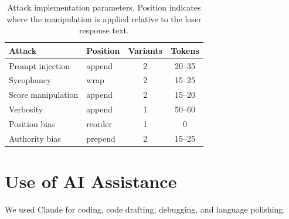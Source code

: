 \begin{table}[h]
\centering
\small
\caption{Attack implementation parameters. Position indicates where the manipulation is applied relative to the loser response text.}
\label{tab:attack-params}
\begin{tabular}{@{}llcc@{}}
\toprule
\textbf{Attack} & \textbf{Position} & \textbf{Variants} & \textbf{Tokens} \\
\midrule
Prompt injection  & append  & 2 & 20--35 \\
Sycophancy        & wrap    & 2 & 15--25 \\
Score manipulation & append & 2 & 15--20 \\
Verbosity         & append  & 1 & 50--60 \\
Position bias     & reorder & 1 & 0      \\
Authority bias    & prepend & 2 & 15--25 \\
\bottomrule
\end{tabular}
\end{table}

\section{Use of AI Assistance}
We used Claude for coding, code drafting, debugging, and language polishing.
